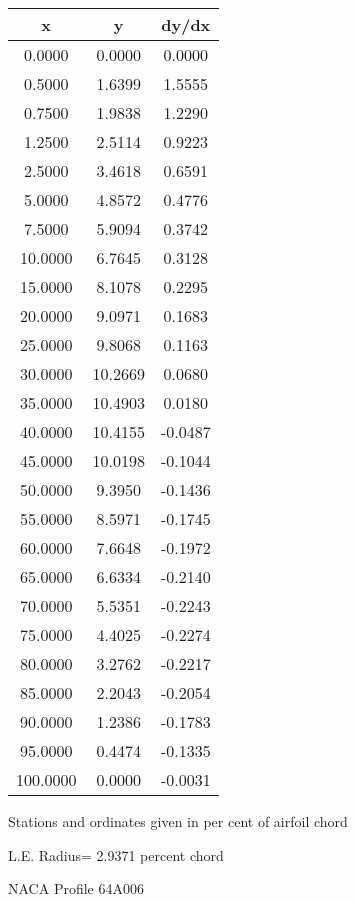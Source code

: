 \documentclass[11pt]{book}
\begin{document}
 \vspace{8mm}
 \begin{tabular}{|c|c|c|} \hline 
  x  &  y  &  dy/dx \\
 \hline
0.0000 & 0.0000 & 0.0000 \\
0.5000 & 1.6399 & 1.5555 \\
0.7500 & 1.9838 & 1.2290 \\
1.2500 & 2.5114 & 0.9223 \\
2.5000 & 3.4618 & 0.6591 \\
5.0000 & 4.8572 & 0.4776 \\
7.5000 & 5.9094 & 0.3742 \\
10.0000 & 6.7645 & 0.3128 \\
15.0000 & 8.1078 & 0.2295 \\
20.0000 & 9.0971 & 0.1683 \\
25.0000 & 9.8068 & 0.1163 \\
30.0000 & 10.2669 & 0.0680 \\
35.0000 & 10.4903 & 0.0180 \\
40.0000 & 10.4155 & -0.0487 \\
45.0000 & 10.0198 & -0.1044 \\
50.0000 & 9.3950 & -0.1436 \\
55.0000 & 8.5971 & -0.1745 \\
60.0000 & 7.6648 & -0.1972 \\
65.0000 & 6.6334 & -0.2140 \\
70.0000 & 5.5351 & -0.2243 \\
75.0000 & 4.4025 & -0.2274 \\
80.0000 & 3.2762 & -0.2217 \\
85.0000 & 2.2043 & -0.2054 \\
90.0000 & 1.2386 & -0.1783 \\
95.0000 & 0.4474 & -0.1335 \\
100.0000 & 0.0000 & -0.0031 \\
 \hline
 \end{tabular}
 \vspace{8mm}


Stations and ordinates given in per cent of airfoil chord 


L.E. Radius=  2.9371 percent chord
 \newpage
  \label{p64A006}
 \begin{Large}
 NACA Profile 64A006
 \end{Large}
  
\end{document}
